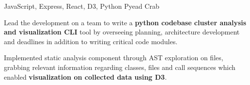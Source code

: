 

\begin{cventries}

        \cventry
    {JavaScript, Express, React, D3, Python} %
    {Pyead Crab \hspace{0.2cm} \hspace{0.2cm}} %
    {} %
    {} %
    {
      \begin{cvitems} %
        \item {Lead the development on a team to write a \textbf{python codebase cluster analysis and visualization CLI} tool by overseeing planning, architecture development and deadlines in addition to writing critical code modules.}
        \item {Implemented static analysis component through AST exploration on files, grabbing relevant information regarding classes, files and call sequences which enabled \textbf{visualization on collected data using D3}.}
      \end{cvitems}
    }




\end{cventries}
